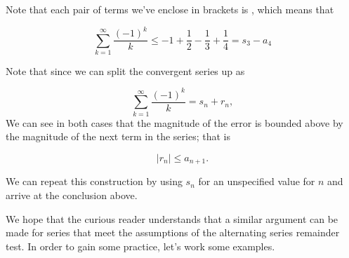 \documentclass{ximera}
\begin{document}
\begin{model}
    Note that each pair of terms we've enclose in brackets is , which means that
  
  \[
  \sum_{k=1}^{\infty} \frac{(-1)^k}{k} \leq -1+\frac{1}{2}-\frac{1}{3} +\frac{1}{4} = s_3 -a_4
  \]
  
Note that since we can split the convergent series up as

\[
\sum_{k=1}^{\infty} \frac{(-1)^k}{k} = s_n +r_n,
\]
We can see in both cases that the magnitude of the error is bounded above by the magnitude of the next term in the series; that is 

\[\big| r_n \big| \leq a_{n+1}.\]

We can repeat this construction by using $s_n$ for an unspecified value for $n$ and arrive at the conclusion above.  
\end{model}

We hope that the curious reader understands that a similar argument can be made for series that meet the assumptions of the alternating series remainder test.  In order to gain some practice, let's work some examples.
\end{document}
